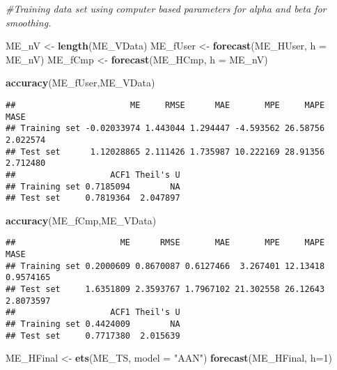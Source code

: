 \documentclass[
]{article}
\newenvironment{Shaded}{\begin{snugshade}}{\end{snugshade}}
\newcommand{\CommentTok}[1]{\textcolor[rgb]{0.56,0.35,0.01}{\textit{#1}}}
\newcommand{\DataTypeTok}[1]{\textcolor[rgb]{0.13,0.29,0.53}{#1}}
\newcommand{\DecValTok}[1]{\textcolor[rgb]{0.00,0.00,0.81}{#1}}
\newcommand{\KeywordTok}[1]{\textcolor[rgb]{0.13,0.29,0.53}{\textbf{#1}}}
\newcommand{\NormalTok}[1]{#1}
\newcommand{\StringTok}[1]{\textcolor[rgb]{0.31,0.60,0.02}{#1}}
\begin{document}
\begin{Shaded}
\begin{Highlighting}[]
\CommentTok{#Training data set using computer based parameters for alpha and beta for smoothing.}
\end{Highlighting}
\end{Shaded}

\begin{Shaded}
\begin{Highlighting}[]
\NormalTok{ME_nV <-}\StringTok{ }\KeywordTok{length}\NormalTok{(ME_VData)}
\NormalTok{ME_fUser <-}\StringTok{ }\KeywordTok{forecast}\NormalTok{(ME_HUser, }\DataTypeTok{h =}\NormalTok{ ME_nV)}
\NormalTok{ME_fCmp <-}\StringTok{ }\KeywordTok{forecast}\NormalTok{(ME_HCmp, }\DataTypeTok{h =}\NormalTok{ ME_nV)}
\end{Highlighting}
\end{Shaded}

\begin{Shaded}
\begin{Highlighting}[]
\KeywordTok{accuracy}\NormalTok{(ME_fUser,ME_VData)}
\end{Highlighting}
\end{Shaded}

\begin{verbatim}
##                       ME     RMSE      MAE       MPE     MAPE     MASE
## Training set -0.02033974 1.443044 1.294447 -4.593562 26.58756 2.022574
## Test set      1.12028865 2.111426 1.735987 10.222169 28.91356 2.712480
##                   ACF1 Theil's U
## Training set 0.7185094        NA
## Test set     0.7819364  2.047897
\end{verbatim}

\begin{Shaded}
\begin{Highlighting}[]
\KeywordTok{accuracy}\NormalTok{(ME_fCmp,ME_VData)}
\end{Highlighting}
\end{Shaded}

\begin{verbatim}
##                     ME      RMSE       MAE       MPE     MAPE      MASE
## Training set 0.2000609 0.8670087 0.6127466  3.267401 12.13418 0.9574165
## Test set     1.6351809 2.3593767 1.7967102 21.302558 26.12643 2.8073597
##                   ACF1 Theil's U
## Training set 0.4424009        NA
## Test set     0.7717380  2.015639
\end{verbatim}

\begin{Shaded}
\begin{Highlighting}[]
\NormalTok{ME_HFinal <-}\StringTok{ }\KeywordTok{ets}\NormalTok{(ME_TS, }\DataTypeTok{model =} \StringTok{"AAN"}\NormalTok{)}
\KeywordTok{forecast}\NormalTok{(ME_HFinal, }\DataTypeTok{h=}\DecValTok{1}\NormalTok{)}
\end{Highlighting}
\end{Shaded}
\end{document}
